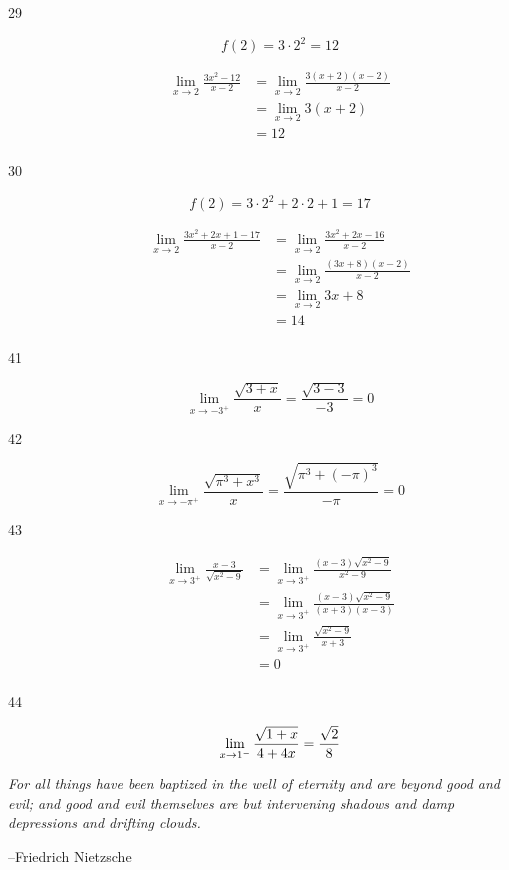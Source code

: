 \documentclass{exam}
\begin{document}
\begin{description}
\item[29]
\[
  f(2) = 3 \cdot 2^2 = 12
\]

\begin{align*}
  \lim_{x \to 2} \frac{3x^2 - 12}{x-2} &= \lim_{x \to 2} \frac{3(x+2)(x-2)}{x-2} \\
  &= \lim_{x \to 2} 3(x + 2) \\
  &= 12 \\
\end{align*}

\item[30]
\[
  f(2) = 3 \cdot 2^2 + 2 \cdot 2 + 1 = 17
\]

\begin{align*}
  \lim_{x \to 2} \frac{3x^2 + 2x + 1 - 17}{x-2} &= \lim_{x \to 2} \frac{3x^2 + 2x - 16}{x-2} \\
  &= \lim_{x \to 2} \frac{(3x+8)(x-2)}{x-2} \\
  &= \lim_{x \to 2} 3x+8 \\
  &= 14 \\
\end{align*}

\item[41]
\[
  \lim_{x \to -3^+} \frac{\sqrt{3 + x}}{x} = \frac{\sqrt{3 - 3}}{-3} = 0
\]

\item[42]
\[
  \lim_{x \to -\pi^+} \frac{\sqrt{\pi^3 + x^3}}{x} = \frac{\sqrt{\pi^3 + (-\pi)^3}}{-\pi} = 0
\]

\item[43]
\begin{align*}
  \lim_{x \to 3^+} \frac{x-3}{\sqrt{x^2 - 9}} &= \lim_{x \to 3^+} \frac{(x-3)\sqrt{x^2 - 9}}{x^2 - 9} \\
   &= \lim_{x \to 3^+} \frac{(x-3)\sqrt{x^2 - 9}}{(x+3)(x-3)} \\
   &= \lim_{x \to 3^+} \frac{\sqrt{x^2 - 9}}{x+3} \\
   &= 0 \\
\end{align*}

\item[44]
\[
  \lim_{x \to 1^-} \frac{\sqrt{1+x}}{4 + 4x} = \frac{\sqrt{2}}{8} \\
\]

\end{description}
\else

\vspace{7 cm}

{\em For all things have been baptized in the well of eternity and are beyond good and evil; and good and evil
  themselves are but intervening shadows and damp depressions and drifting clouds.}

\vspace{.2 cm}

\hspace{1 cm} --Friedrich Nietzsche

\fi
\end{document}
